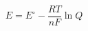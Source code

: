 \documentclass[preview]{standalone}
\begin{document}
\[E = E^\circ - \frac{RT}{nF} \ln Q \tag{1.5}\]
\end{document}
